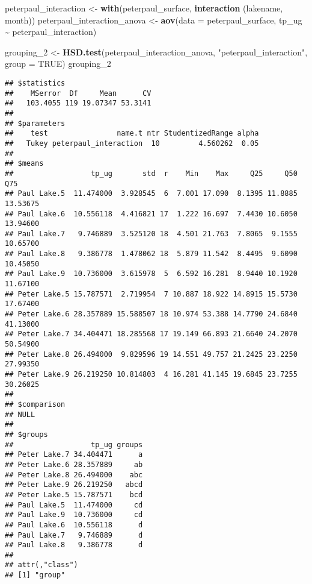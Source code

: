 \documentclass[
]{article}
\newenvironment{Shaded}{\begin{snugshade}}{\end{snugshade}}
\newcommand{\DataTypeTok}[1]{\textcolor[rgb]{0.13,0.29,0.53}{#1}}
\newcommand{\DecValTok}[1]{\textcolor[rgb]{0.00,0.00,0.81}{#1}}
\newcommand{\KeywordTok}[1]{\textcolor[rgb]{0.13,0.29,0.53}{\textbf{#1}}}
\newcommand{\NormalTok}[1]{#1}
\newcommand{\OperatorTok}[1]{\textcolor[rgb]{0.81,0.36,0.00}{\textbf{#1}}}
\newcommand{\OtherTok}[1]{\textcolor[rgb]{0.56,0.35,0.01}{#1}}
\newcommand{\StringTok}[1]{\textcolor[rgb]{0.31,0.60,0.02}{#1}}
\begin{document}
\begin{Shaded}
\begin{Highlighting}[]
\NormalTok{peterpaul\_interaction <{-}}\StringTok{ }\KeywordTok{with}\NormalTok{(peterpaul\_surface, }\KeywordTok{interaction}\NormalTok{ (lakename, month))}
\NormalTok{peterpaul\_interaction\_anova <{-}}\StringTok{ }\KeywordTok{aov}\NormalTok{(}\DataTypeTok{data =}\NormalTok{ peterpaul\_surface, tp\_ug }\OperatorTok{\textasciitilde{}}\StringTok{ }\NormalTok{peterpaul\_interaction) }

\NormalTok{grouping\_}\DecValTok{2}\NormalTok{ <{-}}\StringTok{ }\KeywordTok{HSD.test}\NormalTok{(peterpaul\_interaction\_anova, }\StringTok{"peterpaul\_interaction"}\NormalTok{, }\DataTypeTok{group =} \OtherTok{TRUE}\NormalTok{)}
\NormalTok{grouping\_}\DecValTok{2}
\end{Highlighting}
\end{Shaded}

\begin{verbatim}
## $statistics
##    MSerror  Df     Mean      CV
##   103.4055 119 19.07347 53.3141
## 
## $parameters
##    test                name.t ntr StudentizedRange alpha
##   Tukey peterpaul_interaction  10         4.560262  0.05
## 
## $means
##                  tp_ug       std  r    Min    Max     Q25     Q50      Q75
## Paul Lake.5  11.474000  3.928545  6  7.001 17.090  8.1395 11.8885 13.53675
## Paul Lake.6  10.556118  4.416821 17  1.222 16.697  7.4430 10.6050 13.94600
## Paul Lake.7   9.746889  3.525120 18  4.501 21.763  7.8065  9.1555 10.65700
## Paul Lake.8   9.386778  1.478062 18  5.879 11.542  8.4495  9.6090 10.45050
## Paul Lake.9  10.736000  3.615978  5  6.592 16.281  8.9440 10.1920 11.67100
## Peter Lake.5 15.787571  2.719954  7 10.887 18.922 14.8915 15.5730 17.67400
## Peter Lake.6 28.357889 15.588507 18 10.974 53.388 14.7790 24.6840 41.13000
## Peter Lake.7 34.404471 18.285568 17 19.149 66.893 21.6640 24.2070 50.54900
## Peter Lake.8 26.494000  9.829596 19 14.551 49.757 21.2425 23.2250 27.99350
## Peter Lake.9 26.219250 10.814803  4 16.281 41.145 19.6845 23.7255 30.26025
## 
## $comparison
## NULL
## 
## $groups
##                  tp_ug groups
## Peter Lake.7 34.404471      a
## Peter Lake.6 28.357889     ab
## Peter Lake.8 26.494000    abc
## Peter Lake.9 26.219250   abcd
## Peter Lake.5 15.787571    bcd
## Paul Lake.5  11.474000     cd
## Paul Lake.9  10.736000     cd
## Paul Lake.6  10.556118      d
## Paul Lake.7   9.746889      d
## Paul Lake.8   9.386778      d
## 
## attr(,"class")
## [1] "group"
\end{verbatim}
\end{document}
